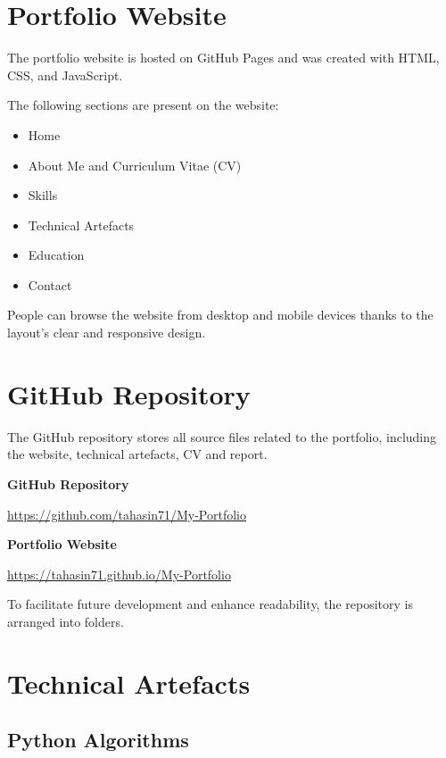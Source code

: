 \documentclass[12pt,a4paper]{article}
\begin{document}
\section{Portfolio Website}

The portfolio website is hosted on GitHub Pages and was created with HTML, CSS, and JavaScript.

The following sections are present on the website:

\begin{itemize}
\item Home
\item About Me and Curriculum Vitae (CV)
\item Skills
\item Technical Artefacts
\item Education
\item Contact
\end{itemize}

People can browse the website from desktop and mobile devices thanks to the layout's clear and responsive design.

\section{GitHub Repository}

The GitHub repository stores all source files related to the portfolio, including the website, technical artefacts, CV and report.

\textbf{GitHub Repository}

\url{https://github.com/tahasin71/My-Portfolio}

\vspace{0.3cm}

\textbf{Portfolio Website}

\url{https://tahasin71.github.io/My-Portfolio}

\vspace{0.3cm}

To facilitate future development and enhance readability, the repository is arranged into folders.

\section{Technical Artefacts}

\subsection{Python Algorithms}
\end{document}
